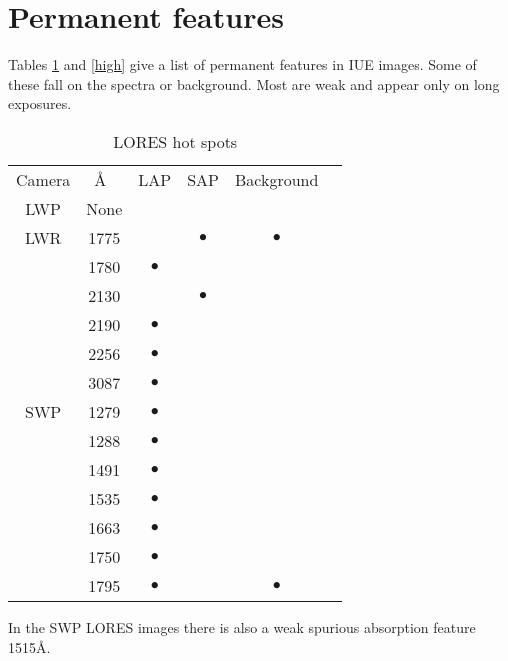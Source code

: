 \documentclass[11pt,twoside,nolof,noabs]{starlink}
\begin{document}
\section{Permanent features
\label{blemish}}

Tables \ref{low} and \ref{high}
give a list of permanent features in IUE images. Some of
these fall on the spectra or background.
Most are weak and appear only on long exposures.

\begin{table}[ht]
\caption{LORES hot spots}
\label{low}
\begin{center}
\begin{tabular}{cccccl}
Camera	& \AA\	& LAP 	& SAP 	& Background \\
LWP	& None  &  \\ \hline
LWR  	& 1775	&	&$\bullet$&$\bullet$\\
	& 1780	&$\bullet$ &	&	\\
        & 2130	&	&$\bullet$&	\\
        & 2190	&$\bullet$&	&	\\
        & 2256	&$\bullet$&	&	\\
        & 3087	&$\bullet$&	&	\\ \hline
SWP     & 1279	&$\bullet$&	&	\\
        & 1288	&$\bullet$&	&	\\
        & 1491	&$\bullet$&	&	\\
        & 1535	&$\bullet$&	&	\\
        & 1663	&$\bullet$&	&	\\
        & 1750	&$\bullet$&	&	\\
        & 1795	&$\bullet$&	&$\bullet$\\
\end{tabular}
\end{center}
\end{table}

In the SWP LORES images there is also a weak spurious absorption feature
1515\AA.
\end{document}
